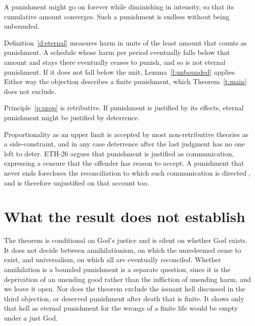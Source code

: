 \documentclass{situationist-preprint}
\begin{document}
\begin{objection}
A punishment might go on forever while diminishing in intensity, so that its cumulative amount converges. Such a punishment is endless without being unbounded.
\end{objection}

\begin{reply}
Definition~\ref{d:eternal} measures harm in units of the least amount that counts as punishment. A schedule whose harm per period eventually falls below that amount and stays there eventually ceases to punish, and so is not eternal punishment. If it does not fall below the unit, Lemma~\ref{l:unbounded} applies. Either way the objection describes a finite punishment, which Theorem~\ref{t:main} does not exclude.
\end{reply}

\begin{objection}
Principle~\ref{p:prop} is retributive. If punishment is justified by its effects, eternal punishment might be justified by deterrence.
\end{objection}

\begin{reply}
Proportionality as an upper limit is accepted by most non-retributive theories as a side-constraint, and in any case deterrence after the last judgment has no one left to deter. ETH-26 argues that punishment is justified as communication, expressing a censure that the offender has reason to accept. A punishment that never ends forecloses the reconciliation to which such communication is directed \citep{Duff2001}, and is therefore unjustified on that account too.
\end{reply}

\section{What the result does not establish}

The theorem is conditional on God's justice and is silent on whether God exists. It does not decide between annihilationism, on which the unredeemed cease to exist, and universalism, on which all are eventually reconciled. Whether annihilation is a bounded punishment is a separate question, since it is the deprivation of an unending good rather than the infliction of unending harm, and we leave it open. Nor does the theorem exclude the issuant hell discussed in the third objection, or deserved punishment after death that is finite. It shows only that hell as eternal punishment for the wrongs of a finite life would be empty under a just God.
\end{document}

